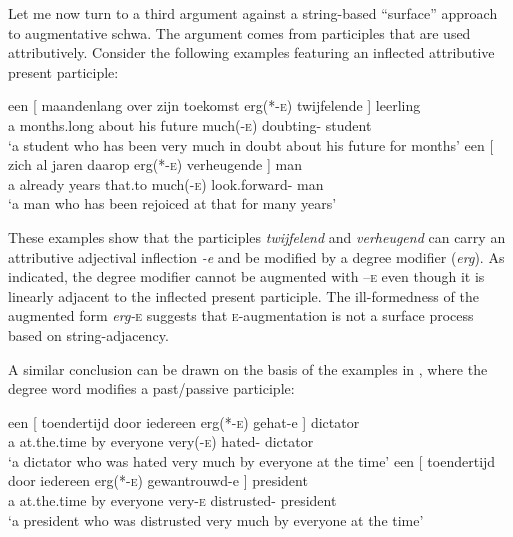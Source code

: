 \documentclass[output=paper]{langsci/langscibook}
\begin{document}
Let me now turn to a third argument against a string-based “surface” approach
to augmentative schwa. The argument comes from participles that are used
attributively. Consider the following examples featuring an inflected
attributive present participle:

\ea%
    \label{ex:18.24}
	\ea
	\gll een [ maandenlang  over    zijn  toekomst    erg(*\textsc{-e})      twijfelende ]      leerling\\
    a  {}    months.long      about  his    future        much(\textsc{-e})    doubting-\Agr{} {} student\\
	\glt \enquote*{a student who has been very much in doubt about his future for months}
	\ex
	\gll een  [ zich  al            jaren    daarop    erg(*\textsc{-e})    verheugende ]          man\\
    a {} \Refl{}  already  years    that.to      much(-\textsc{e})    look.forward-\Agr{} {} man\\
	\glt \enquote*{a man who has been rejoiced at that for many years}
	\z
\z

These examples show that the participles \emph{twijfelend} and
\emph{verheugend} can carry an attributive adjectival inflection \emph{-e} and
be modified by a degree modifier (\emph{erg}). As indicated, the degree
modifier cannot be augmented with –\textsc{e} even though it is linearly
adjacent to the inflected present participle. The ill-formedness of the
augmented form \emph{erg-}\textsc{e} suggests that \textsc{e}-augmentation is
not a surface process based on string-adjacency.

A similar conclusion can be drawn on the basis of the examples in
, where the degree word modifies a past/passive participle:

\ea%
    \label{ex:18.25}
	\ea
	\gll een [ toendertijd    door    iedereen    erg(*-\textsc{e})    gehat-e ]        dictator\\
        a  {} at.the.time        by        everyone    very(-\textsc{e})      hated-\Agr{} {}   dictator\\
	\glt ‘a dictator who was hated very much by everyone at the time’
	\ex
	\gll een [ toendertijd    door    iedereen    erg(*-\textsc{e})    gewantrouwd-e ]    president\\
    a   {}   at.the.time        by        everyone    very-\textsc{e}        distrusted-\Agr{} {}     president\\
	\glt \enquote*{a president who was distrusted very much by everyone at the time}
	\z
\z
\end{document}
